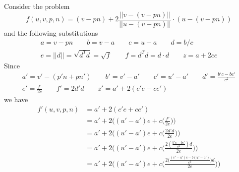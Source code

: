 \documentclass[../main.tex]{subfiles}
\begin{document}
Consider the problem
\begin{equation}
f(u,v,p,n) = (v-p n)+2\frac{||v-(v-p n)||}{||u-(v-p n)||}\cdot(u-(v-p n))
\end{equation}
and the following substitutions
\begin{align*}
a = v-pn \qquad b = v - a \qquad c = u - a \qquad d = b/c \\ 
e = ||d||=\sqrt{d^Td}=\sqrt{f} \qquad f = d^Td=d\cdot d \qquad z = a + 2ce 
\end{align*}
Since
\begin{align*}
a' = v' - (p'n + pn') \qquad b' = v' - a' \qquad c' = u' - a' \qquad d' = \frac{b'c-bc'}{c^2} \\
e' = \frac{f'}{2e} \qquad f' = 2d'd \qquad z' = a' + 2(c'e+ce')
\end{align*}
we have
\begin{align*}
f'(u,v,p,n) &= a' + 2(c'e+ce') \\
			&= a' + 2\Bigg((u' - a')e+c\Big(\frac{f'}{2e}\Big)\Bigg) \\
			&= a' + 2\Bigg((u' - a')e+c\Big(\frac{2d'd}{2e}\Big)\Bigg) \\
			&= a' + 2\Bigg((u' - a')e+c\Big(\frac{2(\frac{b'c-bc'}{c^2})d}{2e}\Big)\Bigg) \\
			&= a' + 2\Bigg((u' - a')e+c\Big(\frac{2\big(\frac{(v' - a')c-b(u' - a')}{c^2}\big)d}{2e}\Big)\Bigg) \\
\end{align*}
\end{document}
